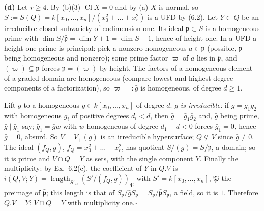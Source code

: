 \documentclass[11pt]{article}
\begin{document}
\textbf{(d)} Let $r\ge4$. By (b)(3) $\operatorname{Cl}X=0$ and by (a) $X$ is normal, so $S:=S(Q)=k[x_0,\dots,x_n]/(x_0^2+\dots+x_r^2)$ is a UFD by (6.2). Let $Y\subset Q$ be an irreducible closed subvariety of codimension one. Its ideal $\bar{\mathfrak p}\subset S$ is a homogeneous prime with $\dim S/\bar{\mathfrak p}=\dim Y+1=\dim S-1$, hence of height one. In a UFD a height-one prime is principal: pick a nonzero homogeneous $a\in\bar{\mathfrak p}$ (possible, $\bar{\mathfrak p}$ being homogeneous and nonzero); some prime factor $\varpi$ of $a$ lies in $\bar{\mathfrak p}$, and $(\varpi)\subseteq\bar{\mathfrak p}$ forces $\bar{\mathfrak p}=(\varpi)$ by height. The factors of a homogeneous element of a graded domain are homogeneous (compare lowest and highest degree components of a factorization), so $\varpi=:\bar g$ is homogeneous, of degree $d\ge1$.

Lift $\bar g$ to a homogeneous $g\in k[x_0,\dots,x_n]$ of degree $d$. \emph{$g$ is irreducible:} if $g=g_1g_2$ with homogeneous $g_i$ of positive degrees $d_i<d$, then $\bar g=\bar g_1\bar g_2$ and, $\bar g$ being prime, $\bar g\mid\bar g_1$ say; $\bar g_1=\bar g\bar w$ with $\bar w$ homogeneous of degree $d_1-d<0$ forces $\bar g_1=0$, hence $\bar g=0$, absurd. So $V=V_+(g)$ is an irreducible hypersurface; $Q\not\subseteq V$ since $\bar g\ne0$. The ideal $(f_Q,g)$, $f_Q=x_0^2+\dots+x_r^2$, has quotient $S/(\bar g)=S/\bar{\mathfrak p}$, a domain; so it is prime and $V\cap Q=Y$ as sets, with the single component $Y$. Finally the multiplicity: by Ex.~6.2(c), the coefficient of $Y$ in $Q.V$ is $i(Q,V;Y)=\operatorname{length}_{S'_{\mathfrak P}}(S'/(f_Q,g))_{\mathfrak P}$ with $S'=k[x_0,\dots,x_n]$, $\mathfrak P$ the preimage of $\bar{\mathfrak p}$; this length is that of $S_{\bar{\mathfrak p}}/\bar gS_{\bar{\mathfrak p}}=S_{\bar{\mathfrak p}}/\bar{\mathfrak p}S_{\bar{\mathfrak p}}$, a field, so it is $1$. Therefore $Q.V=Y$: $V\cap Q=Y$ with multiplicity one.\hfill$\square$
\end{document}
